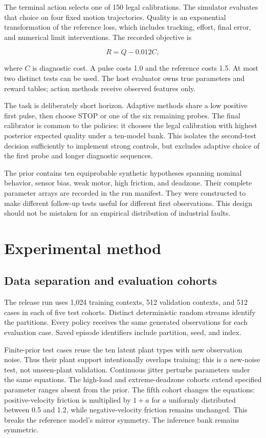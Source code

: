 \documentclass[
  10pt,
]{article}
\begin{document}
The terminal action selects one of 150 legal calibrations. The simulator
evaluates that choice on four fixed motion trajectories. Quality is an
exponential transformation of the reference loss, which includes
tracking, effort, final error, and numerical limit interventions. The
recorded objective is

\[R=Q-0.012C,\]

where \(C\) is diagnostic cost. A pulse costs 1.0 and the reference
costs 1.5. At most two distinct tests can be used. The host evaluator
owns true parameters and reward tables; action methods receive observed
features only.

The task is deliberately short horizon. Adaptive methods share a low
positive first pulse, then choose STOP or one of the six remaining
probes. The final calibrator is common to the policies: it chooses the
legal calibration with highest posterior expected quality under a
ten-model bank. This isolates the second-test decision sufficiently to
implement strong controls, but excludes adaptive choice of the first
probe and longer diagnostic sequences.

The prior contains ten equiprobable synthetic hypotheses spanning
nominal behavior, sensor bias, weak motor, high friction, and deadzone.
Their complete parameter arrays are recorded in the run manifest. They
were constructed to make different follow-up tests useful for different
first observations. This design should not be mistaken for an empirical
distribution of industrial faults.

\section{Experimental method}\label{experimental-method}

\subsection{Data separation and evaluation
cohorts}\label{data-separation-and-evaluation-cohorts}

The release run uses 1,024 training contexts, 512 validation contexts,
and 512 cases in each of five test cohorts. Distinct deterministic
random streams identify the partitions. Every policy receives the same
generated observations for each evaluation case. Saved episode
identifiers include partition, seed, and index.

Finite-prior test cases reuse the ten latent plant types with new
observation noise. Thus their plant support intentionally overlaps
training; this is a new-noise test, not unseen-plant validation.
Continuous jitter perturbs parameters under the same equations. The
high-load and extreme-deadzone cohorts extend specified parameter ranges
absent from the prior. The fifth cohort changes the equations:
positive-velocity friction is multiplied by \(1+a\) for \(a\) uniformly
distributed between 0.5 and 1.2, while negative-velocity friction
remains unchanged. This breaks the reference model's mirror symmetry.
The inference bank remains symmetric.
\end{document}
